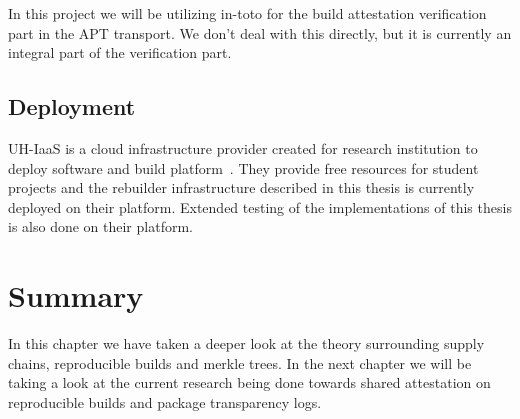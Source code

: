 \documentclass[../Main/thesis.tex]{subfiles}
\begin{document}
In this project we will be utilizing in-toto for the build attestation
verification part in the APT transport. We don't deal with this directly, but
it is currently an integral part of the verification part.


\subsection*{Deployment}%
\label{sub:deployment}
UH-IaaS is a cloud infrastructure provider created for research institution to
deploy software and build platform~\cite{uhiaas}. They provide free resources for student
projects and the rebuilder infrastructure described in this thesis is currently
deployed on their platform. Extended testing of the implementations of this
thesis is also done on their platform.


\section*{Summary}\label{sec:summary-technologies} 
In this chapter we have taken a deeper look at the theory surrounding supply
chains, reproducible builds and merkle trees. In the next chapter we will be
taking a look at the current research being done towards shared attestation on
reproducible builds and package transparency logs.

\blankpage
\end{document}
